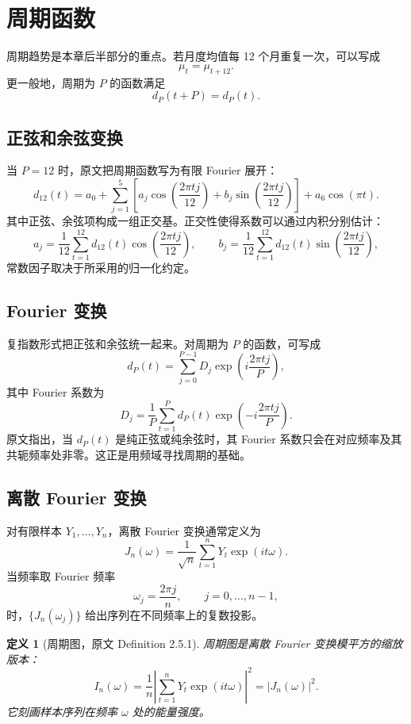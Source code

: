 \documentclass[11pt,a4paper]{ctexart}
\newtheorem{definition}{定义}[section]
\begin{document}
\section{周期函数}

周期趋势是本章后半部分的重点。若月度均值每 12 个月重复一次，可以写成
\[
  \mu_t=\mu_{t+12}.
\]
更一般地，周期为 \(P\) 的函数满足
\[
  d_P(t+P)=d_P(t).
\]

\subsection{正弦和余弦变换}

当 \(P=12\) 时，原文把周期函数写为有限 Fourier 展开：
\[
  d_{12}(t)
  =a_0+\sum_{j=1}^{5}
  \left[
    a_j\cos\left(\frac{2\pi tj}{12}\right)
    +b_j\sin\left(\frac{2\pi tj}{12}\right)
  \right]
  +a_6\cos(\pi t).
\]
其中正弦、余弦项构成一组正交基。正交性使得系数可以通过内积分别估计：
\[
  a_j=\frac{1}{12}\sum_{t=1}^{12}d_{12}(t)
      \cos\left(\frac{2\pi tj}{12}\right),
  \qquad
  b_j=\frac{1}{12}\sum_{t=1}^{12}d_{12}(t)
      \sin\left(\frac{2\pi tj}{12}\right),
\]
常数因子取决于所采用的归一化约定。

\subsection{Fourier 变换}

复指数形式把正弦和余弦统一起来。对周期为 \(P\) 的函数，可写成
\[
  d_P(t)=\sum_{j=0}^{P-1}D_j\exp\left(i\frac{2\pi tj}{P}\right),
\]
其中 Fourier 系数为
\[
  D_j=\frac{1}{P}\sum_{t=1}^P
  d_P(t)\exp\left(-i\frac{2\pi tj}{P}\right).
\]
原文指出，当 \(d_P(t)\) 是纯正弦或纯余弦时，其 Fourier 系数只会在对应频率及其共轭频率处非零。这正是用频域寻找周期的基础。

\subsection{离散 Fourier 变换}

对有限样本 \(Y_1,\ldots,Y_n\)，离散 Fourier 变换通常定义为
\[
  J_n(\omega)
  =\frac{1}{\sqrt{n}}\sum_{t=1}^n Y_t\exp(it\omega).
\]
当频率取 Fourier 频率
\[
  \omega_j=\frac{2\pi j}{n},\qquad j=0,\ldots,n-1,
\]
时，\(\{J_n(\omega_j)\}\) 给出序列在不同频率上的复数投影。

\begin{definition}[周期图，原文 Definition 2.5.1]
周期图是离散 Fourier 变换模平方的缩放版本：
\[
  I_n(\omega)
  =\frac{1}{n}\left|\sum_{t=1}^nY_t\exp(it\omega)\right|^2
  =|J_n(\omega)|^2.
\]
它刻画样本序列在频率 \(\omega\) 处的能量强度。
\end{definition}
\end{document}
